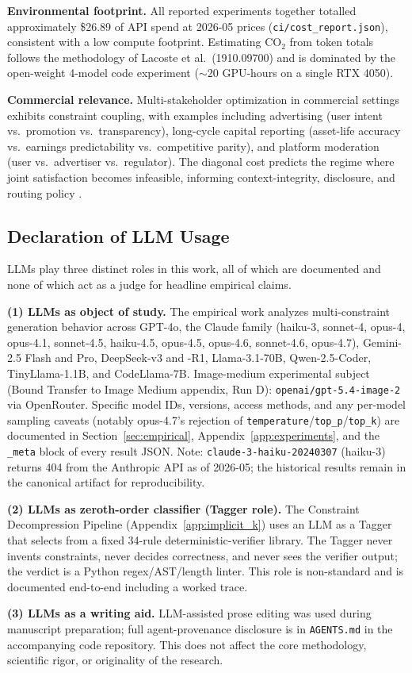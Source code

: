 \textbf{Environmental footprint.} All reported experiments together totalled approximately \$26.89 of API spend at 2026-05 prices (\texttt{ci/cost\_report.json}), consistent with a low compute footprint. Estimating CO$_2$ from token totals follows the methodology of Lacoste et al.\ (1910.09700) and is dominated by the open-weight 4-model code experiment ($\sim$20 GPU-hours on a single RTX 4050).

\textbf{Commercial relevance.} Multi-stakeholder optimization in commercial settings exhibits constraint coupling, with examples including advertising (user intent vs.\ promotion vs.\ transparency), long-cycle capital reporting (asset-life accuracy vs.\ earnings predictability vs.\ competitive parity), and platform moderation (user vs.\ advertiser vs.\ regulator). The diagonal cost predicts the regime where joint satisfaction becomes infeasible, informing context-integrity, disclosure, and routing policy \citep{anthropic2026aeiv4}.

\subsection{Declaration of LLM Usage}\label{sec:llm_usage}
LLMs play three distinct roles in this work, all of which are documented and none of which act as a judge for headline empirical claims.

\textbf{(1) LLMs as object of study.} The empirical work analyzes multi-constraint generation behavior across GPT-4o, the Claude family (haiku-3, sonnet-4, opus-4, opus-4.1, sonnet-4.5, haiku-4.5, opus-4.5, opus-4.6, sonnet-4.6, opus-4.7), Gemini-2.5 Flash and Pro, DeepSeek-v3 and -R1, Llama-3.1-70B, Qwen-2.5-Coder, TinyLlama-1.1B, and CodeLlama-7B. Image-medium experimental subject (Bound Transfer to Image Medium appendix, Run D): \texttt{openai/gpt-5.4-image-2} via OpenRouter. Specific model IDs, versions, access methods, and any per-model sampling caveats (notably opus-4.7's rejection of \texttt{temperature}/\texttt{top\_p}/\texttt{top\_k}) are documented in Section~\ref{sec:empirical}, Appendix~\ref{app:experiments}, and the \texttt{\_meta} block of every result JSON. Note: \texttt{claude-3-haiku-20240307} (haiku-3) returns 404 from the Anthropic API as of 2026-05; the historical results remain in the canonical artifact for reproducibility.

\textbf{(2) LLMs as zeroth-order classifier (Tagger role).} The Constraint Decompression Pipeline (Appendix~\ref{app:implicit_k}) uses an LLM as a Tagger that selects from a fixed 34-rule deterministic-verifier library. The Tagger never invents constraints, never decides correctness, and never sees the verifier output; the verdict is a Python regex/AST/length linter. This role is non-standard and is documented end-to-end including a worked trace.

\textbf{(3) LLMs as a writing aid.} LLM-assisted prose editing was used during manuscript preparation; full agent-provenance disclosure is in \texttt{AGENTS.md} in the accompanying code repository. This does not affect the core methodology, scientific rigor, or originality of the research.
